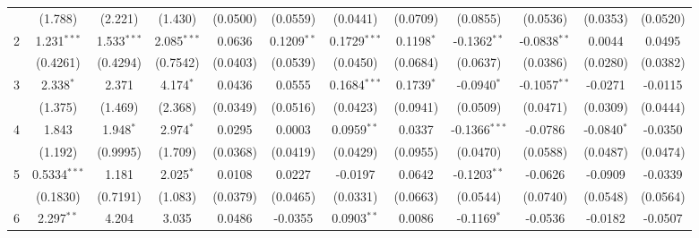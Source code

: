 \begin{table}[htbp]
\begin{tabular}{lccccccccccc}
                           & (1.788)        & (2.221)       & (1.430)        & (0.0500)       & (0.0559)       & (0.0441)       & (0.0709)            & (0.0855)        & (0.0536)        & (0.0353)         & (0.0520)\\   
      2                    & 1.231$^{***}$  & 1.533$^{***}$ & 2.085$^{***}$  & 0.0636         & 0.1209$^{**}$  & 0.1729$^{***}$ & 0.1198$^{*}$        & -0.1362$^{**}$  & -0.0838$^{**}$  & 0.0044           & 0.0495\\   
                           & (0.4261)       & (0.4294)      & (0.7542)       & (0.0403)       & (0.0539)       & (0.0450)       & (0.0684)            & (0.0637)        & (0.0386)        & (0.0280)         & (0.0382)\\   
      3                    & 2.338$^{*}$    & 2.371         & 4.174$^{*}$    & 0.0436         & 0.0555         & 0.1684$^{***}$ & 0.1739$^{*}$        & -0.0940$^{*}$   & -0.1057$^{**}$  & -0.0271          & -0.0115\\   
                           & (1.375)        & (1.469)       & (2.368)        & (0.0349)       & (0.0516)       & (0.0423)       & (0.0941)            & (0.0509)        & (0.0471)        & (0.0309)         & (0.0444)\\   
      4                    & 1.843          & 1.948$^{*}$   & 2.974$^{*}$    & 0.0295         & 0.0003         & 0.0959$^{**}$  & 0.0337              & -0.1366$^{***}$ & -0.0786         & -0.0840$^{*}$    & -0.0350\\   
                           & (1.192)        & (0.9995)      & (1.709)        & (0.0368)       & (0.0419)       & (0.0429)       & (0.0955)            & (0.0470)        & (0.0588)        & (0.0487)         & (0.0474)\\   
      5                    & 0.5334$^{***}$ & 1.181         & 2.025$^{*}$    & 0.0108         & 0.0227         & -0.0197        & 0.0642              & -0.1203$^{**}$  & -0.0626         & -0.0909          & -0.0339\\   
                           & (0.1830)       & (0.7191)      & (1.083)        & (0.0379)       & (0.0465)       & (0.0331)       & (0.0663)            & (0.0544)        & (0.0740)        & (0.0548)         & (0.0564)\\   
      6                    & 2.297$^{**}$   & 4.204         & 3.035          & 0.0486         & -0.0355        & 0.0903$^{**}$  & 0.0086              & -0.1169$^{*}$   & -0.0536         & -0.0182          & -0.0507\\   

\end{tabular}
\end{table}
